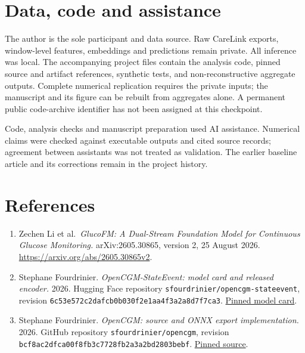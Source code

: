 \documentclass[11pt,letterpaper]{article}
\providecommand{\tightlist}{\setlength{\itemsep}{0pt}\setlength{\parskip}{0pt}}
\begin{document}
\section{Data, code and assistance}\label{data-code-and-assistance}

The author is the sole participant and data source. Raw CareLink
exports, window-level features, embeddings and predictions remain
private. All inference was local. The accompanying project files contain
the analysis code, pinned source and artifact references, synthetic
tests, and non-reconstructive aggregate outputs. Complete numerical
replication requires the private inputs; the manuscript and its figure
can be rebuilt from aggregates alone. A permanent public code-archive
identifier has not been assigned at this checkpoint.

Code, analysis checks and manuscript preparation used AI assistance.
Numerical claims were checked against executable outputs and cited
source records; agreement between assistants was not treated as
validation. The earlier baseline article and its corrections remain in
the project history.

\section{References}\label{references}

\begin{enumerate}
\def\labelenumi{\arabic{enumi}.}
\tightlist
\item
  Zechen Li et al.~\emph{GlucoFM: A Dual-Stream Foundation Model for
  Continuous Glucose Monitoring.} arXiv:2605.30865, version 2, 25 August
  2026. \url{https://arxiv.org/abs/2605.30865v2}.
\item
  Stephane Fourdrinier. \emph{OpenCGM-StateEvent: model card and
  released encoder.} 2026. Hugging Face repository
  {\ttfamily\nolinkurl{sfourdrinier/opencgm-stateevent}}, revision
  {\ttfamily\nolinkurl{6c53e572c2dafcb0b030f2e1aa4f3a2a8d7f7ca3}}.
  \href{https://huggingface.co/sfourdrinier/opencgm-stateevent/blob/6c53e572c2dafcb0b030f2e1aa4f3a2a8d7f7ca3/README.md}{Pinned
  model card}.
\item
  Stephane Fourdrinier. \emph{OpenCGM: source and ONNX export
  implementation.} 2026. GitHub repository
  \texttt{sfourdrinier/opencgm}, revision
  {\ttfamily\nolinkurl{bcf8ac2dfca00f8fb3c7728fb2a3a2bd2803bebf}}.
  \href{https://github.com/sfourdrinier/opencgm/tree/bcf8ac2dfca00f8fb3c7728fb2a3a2bd2803bebf}{Pinned
  source}.
\end{enumerate}
\end{document}
